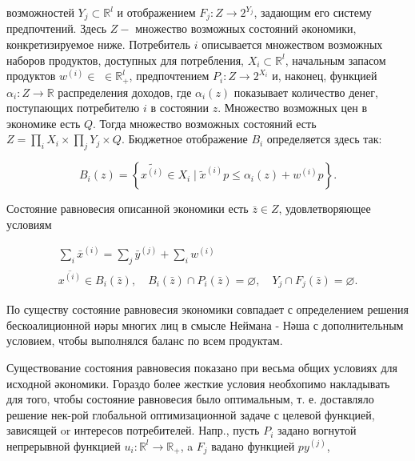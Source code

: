 \documentclass[10pt]{article}
\begin{document}
возможностей $Y_{j} \subset \mathbb{R}^{l}$ и отображением $F_{j}: Z \rightarrow 2^{Y_{j}}$, задающим его систему предпочтений. Здесь $Z-$ множество возможных состояний әкономики, конкретизируемое ниже. Потребитель $i$ описывается множеством возможных наборов продуктов, доступных для потребления, $X_{i} \subset \mathbb{R}^{l}$, начальным запасом продуктов $w^{(i)} \in$ $\in \mathbb{R}_{+}^{l}$, предпочтением $P_{i}: Z \rightarrow 2^{X_{i}}$ и, наконец, функцией $\alpha_{i}: Z \rightarrow \mathbb{R}$ распределения доходов, где $\alpha_{i}(z)$ показывает количество денег, поступающих потребителю $i$ в состоянии $z$. Множество возможных цен в экономике есть $Q$. Тогда множество возможных состояний есть $Z=\prod_{i} X_{i} \times \prod_{j} Y_{j} \times Q$. Бюджетное отображение $B_{i}$ определяется здесь так:



\[

B_{i}(z)=\left\{\tilde{x^{(i)}} \in X_{i} \mid \tilde{x}^{(i)} p \leqslant \alpha_{i}(z)+w^{(i)} p\right\} .

\]



Состояние равновесия описанной экономики есть $\bar{z} \in Z$, удовлетворяющее условиям



\[

\begin{gathered}

\sum_{i} \bar{x}^{(i)}=\sum_{j} \bar{y}^{(j)}+\sum_{i} w^{(i)} \\

\overline{x^{(i)}} \in B_{i}(\bar{z}), \quad B_{i}(\bar{z}) \cap P_{i}(\bar{z})=\varnothing, \quad Y_{j} \cap F_{j}(\bar{z})=\varnothing .

\end{gathered}

\]



По существу состояние равновесия экономики совпадает с определением решения бескоалиционной иәры многих лиц в смысле Неймана - Нәша с дополнительным условием, чтобы выполнялся баланс по всем продуктам.



Существование состояния равновесия показано при весьма общих условиях для исходной әкономики. Гораздо более жесткие условия необхопимо накладывать для того, чтобы состояние равновесия было оптимальным, т. е. доставляло решение нек-рой глобальной оптимизационной задаче с целевой функцией, зависящей or интересов потребителей. Напр., пусть $P_{i}$ задано вогнутой непрерывной функцией $u_{i}: \mathbb{R}^{l} \rightarrow \mathbb{R}_{+}$, a $F_{j}$ вадано функцией $p y^{(j)}$,
\end{document}
